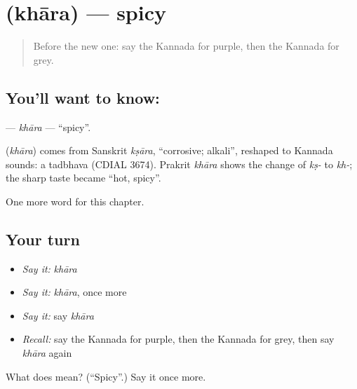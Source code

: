 \section[\texorpdfstring{\kn{ಖಾರ} (khāra)}{ಖಾರ (khāra)}]{ (khāra) — spicy}

\label{lesson:KA-C144-khara}



\begin{quote}
Before the new one: say the Kannada for purple, then the Kannada for grey.
\end{quote}

\subsection*{You'll want to know: }
\textbf{} — \emph{khāra} — \textquotedblleft{}spicy\textquotedblright{}.

\begin{cousinweb}
\textbf{} (\emph{khāra}) comes from Sanskrit \emph{kṣāra}, \textquotedblleft{}corrosive; alkali\textquotedblright{}, reshaped to Kannada sounds: a tadbhava (CDIAL 3674). Prakrit \emph{khāra} shows the change of \emph{kṣ-} to \emph{kh-}; the sharp taste became \textquotedblleft{}hot, spicy\textquotedblright{}.
\end{cousinweb}

\begin{grammarlens}[title={What you've built}]
One more word for this chapter.
\end{grammarlens}

\subsection*{Your turn}
\begin{itemize}
\raggedright
  \item \emph{Say it:} \emph{khāra}
  \item \emph{Say it:} \emph{khāra}, once more
  \item \emph{Say it:} say \emph{khāra}
  \item \emph{Recall:} say the Kannada for purple, then the Kannada for grey, then say \emph{khāra} again
\end{itemize}

\begin{tcolorbox}[breakable,colback=teal!4,colframe=teal!35!black,title={Before you move on}]
What does  mean? (\textquotedblleft{}Spicy\textquotedblright{}.) Say it once more.
\end{tcolorbox}
